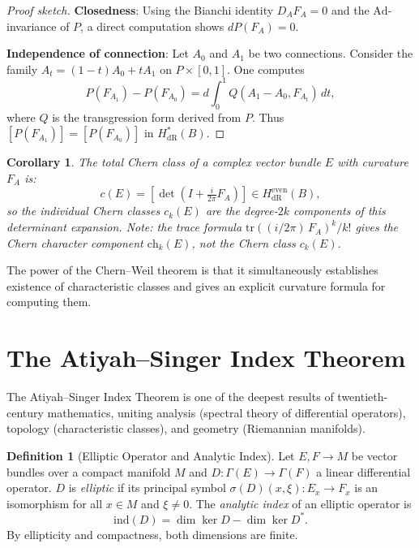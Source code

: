 \documentclass[12pt,a4paper]{amsart}
\newtheorem{corollary}[theorem]{Corollary}
\theoremstyle{definition}
\newtheorem{definition}[theorem]{Definition}
\begin{document}
\begin{proof}[Proof sketch]
\textbf{Closedness}: Using the Bianchi identity $D_A F_A = 0$ and the
$\mathrm{Ad}$-invariance of $P$, a direct computation shows $d P(F_A) = 0$.

\textbf{Independence of connection}: Let $A_0$ and $A_1$ be two connections.
Consider the family $A_t = (1-t)A_0 + tA_1$ on $P \times [0,1]$. One computes
\[
  P(F_{A_1}) - P(F_{A_0}) = d\!\int_0^1 Q(A_1 - A_0, F_{A_t})\, dt,
\]
where $Q$ is the transgression form derived from $P$. Thus $[P(F_{A_1})] =
[P(F_{A_0})]$ in $H^*_{\mathrm{dR}}(B)$.
\end{proof}

\begin{corollary}
The total Chern class of a complex vector bundle $E$ with curvature $F_A$ is:
\[
  c(E) = \left[\det\!\left(I + \tfrac{i}{2\pi} F_A\right)\right]
  \in H^{\mathrm{even}}_{\mathrm{dR}}(B),
\]
so the individual Chern classes $c_k(E)$ are the degree-$2k$ components of
this determinant expansion.  Note: the trace formula
$\mathrm{tr}((i/2\pi)\,F_A)^k/k!$ gives the \emph{Chern character}
component $\mathrm{ch}_k(E)$, not the Chern class $c_k(E)$.
\end{corollary}

The power of the Chern--Weil theorem is that it simultaneously establishes
existence of characteristic classes and gives an explicit curvature formula
for computing them.

\section{The Atiyah--Singer Index Theorem}
\label{sec:atiyahsinger}

The Atiyah--Singer Index Theorem is one of the deepest results of
twentieth-century mathematics, uniting analysis (spectral theory of
differential operators), topology (characteristic classes), and geometry
(Riemannian manifolds).

\begin{definition}[Elliptic Operator and Analytic Index]
Let $E, F \to M$ be vector bundles over a compact manifold $M$ and
$D \colon \Gamma(E) \to \Gamma(F)$ a linear differential operator. $D$ is
\emph{elliptic} if its principal symbol
$\sigma(D)(x, \xi) \colon E_x \to F_x$ is an isomorphism for all $x \in M$
and $\xi \neq 0$. The \emph{analytic index} of an elliptic operator is
\[
  \mathrm{ind}(D) = \dim \ker D - \dim \ker D^*.
\]
By ellipticity and compactness, both dimensions are finite.
\end{definition}
\end{document}
